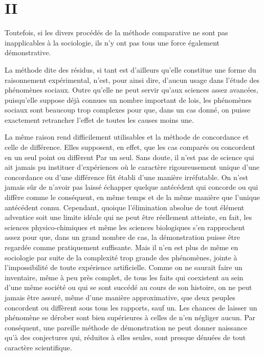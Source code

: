 \documentclass[french,twoside]{book} %
\begin{document}
\section[{II}]{II}
\noindent Toutefois, si les divers procédés de la méthode comparative ne sont pas inapplicables à la sociologie, ils n’y ont pas tous une force également démonstrative.\par
La méthode dite des résidus, si tant est d’ailleurs qu’elle constitue une forme du raisonnement expérimental, n’est, pour ainsi dire, d’aucun usage dans l’étude des phénomènes sociaux. Outre qu’elle ne peut servir qu’aux sciences assez avancées, puisqu’elle suppose déjà connues un nombre important de lois, les phénomènes sociaux sont beaucoup trop complexes pour que, dans un cas donné, on puisse exactement retrancher l’effet de toutes les causes moins une.\par
La même raison rend difficilement utilisables et la méthode de concordance et celle de différence. Elles supposent, en effet, que les cas comparés ou concordent en un seul point ou diffèrent Par un seul. Sans doute, il n’est pas de science qui ait jamais pu instituer d’expériences où le caractère rigoureusement unique d’une concordance ou d’une différence fût établi d’une manière irréfutable. On n’est jamais sûr de n’avoir pas laissé échapper quelque antécédent qui concorde ou qui diffère comme le conséquent, en même temps et de la même manière que l’unique antécédent connu. Cependant, quoique l’élimination absolue de tout élément adventice soit une limite idéale qui ne peut être réellement atteinte, en fait, les sciences physico-chimiques et même les sciences biologiques s’en rapprochent assez pour que, dans un grand nombre de cas, la démonstration puisse être regardée comme pratiquement suffisante. Mais il n’en est plus de même en sociologie par suite de la complexité trop grande des phénomènes, jointe à l’impossibilité de toute expérience artificielle. Comme on ne saurait faire un inventaire, même à peu près complet, de tous les faits qui coexistent au sein d’une même société ou qui se sont succédé au cours de son histoire, on ne peut jamais être assuré, même d’une manière approximative, que deux peuples concordent ou diffèrent sous tous les rapports, sauf un. Les chances de laisser un phénomène se dérober sont bien supérieures à celles de n’en négliger aucun. Par conséquent, une pareille méthode de démonstration ne peut donner naissance qu’à des conjectures qui, réduites à elles seules, sont presque dénuées de tout caractère scientifique.\par
\end{document}
